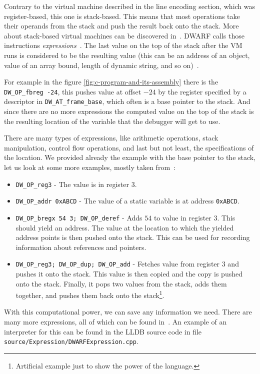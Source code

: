 Contrary to the virtual machine described in the line encoding section, which
was register-based, this one is stack-based. This means that most operations
take their operands from the stack and push the result back onto the stack.
More about stack-based virtual machines can be discovered
in~\cite{crafting-interpreters}. DWARF calls those instructions
\textit{expressions}~\cite{dwarf}. The last value on the top of the stack after
the VM runs is considered to be the resulting value (this can be an address of
an object, value of an array bound, length of dynamic string, and so
on)~\cite{dwarf}.

For example in the figure \ref{fig:c-program-and-its-assembly} there is the
\verb|DW_OP_fbreg -24|, this pushes value at offset $-24$ by the register
specified by a descriptor in \verb|DW_AT_frame_base|, which often is a base
pointer to the stack. And since there are no more expressions the computed
value on the top of the stack is the resulting location of the variable that
the debugger will get to use.

There are many types of expressions, like arithmetic operations, stack
manipulation, control flow operations, and last but not least, the
specifications of the location. We provided already the example with the base
pointer to the stack, let us look at some more examples, mostly taken
from~\cite{dwarf}:
\begin{itemize}
    \item \verb|DW_OP_reg3| - The value is in register $3$.
    \item \verb|DW_OP_addr 0xABCD| - The value of a static variable is at
        address \verb|0xABCD|.
    \item \verb|DW_OP_bregx 54 3; DW_OP_deref| - Adds $54$ to value in
        register $3$. This should yield an address. The value at the location
        to which the yielded address points is then pushed onto the stack. This
        can be used for recording information about references and pointers.
    \item \verb|DW_OP_reg3; DW_OP_dup; DW_OP_add| - Fetches value from
        register $3$ and pushes it onto the stack. This value is then copied
        and the copy is pushed onto the stack. Finally, it pops two values from
        the stack, adds them together, and pushes them back onto the
        stack\footnote{Artificial example just to show the power of the
        language.}.
\end{itemize}

With this computational power, we can save any information we need. There are
many more expressions, all of which can be found in~\cite{dwarf}. An example of
an interpreter for this can be found in the LLDB source code in file
\texttt{source/Expression/DWARFExpression.cpp}.


